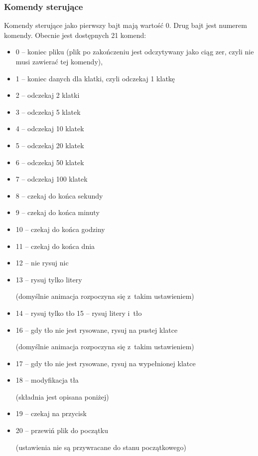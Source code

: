 \subsubsection{Komendy sterujące}
Komendy sterujące jako pierwszy bajt mają wartość 0. Drug bajt jest numerem komendy. Obecnie jest dostępnych 21 komend:
\begin{itemize}
\item 0 – koniec pliku (plik po zakończeniu jest odczytywany jako ciąg zer, czyli nie musi zawierać tej komendy),
\item 1 – koniec danych dla klatki, czyli odczekaj 1 klatkę
\item 2 – odczekaj 2 klatki
\item 3 – odczekaj 5 klatek
\item 4 – odczekaj 10 klatek
\item 5 – odczekaj 20 klatek
\item 6 – odczekaj 50 klatek
\item 7 – odczekaj 100 klatek
\item 8 – czekaj do końca sekundy
\item 9 – czekaj do końca minuty
\item 10 – czekaj do końca godziny
\item 11 – czekaj do końca dnia
\item 12 – nie rysuj nic
\item 13 – rysuj tylko litery

(domyślnie animacja rozpoczyna się z~takim ustawieniem)
\item 14 – rysuj tylko tło
15 – rysuj litery i~tło
\item 16 – gdy tło nie jest rysowane, rysuj na pustej klatce

(domyślnie animacja rozpoczyna się z~takim ustawieniem)
\item 17 – gdy tło nie jest rysowane, rysuj na wypełnionej klatce
\item 18 – modyfikacja tła

(składnia jest opisana poniżej)
\item 19 – czekaj na przycisk
\item 20 – przewiń plik do początku

(ustawienia nie są przywracane do stanu początkowego)
\end{itemize}

